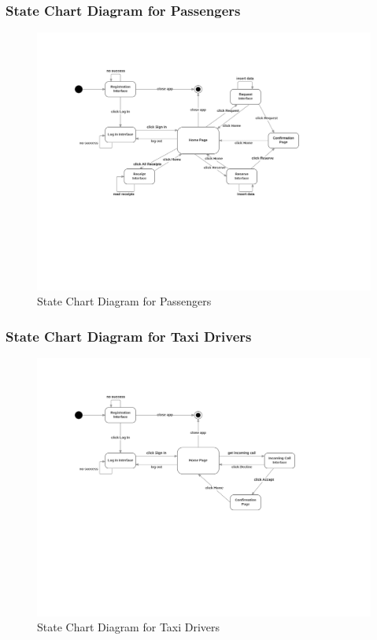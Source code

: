 \subsubsection{State Chart Diagram for Passengers}

\begin{figure}[htbp]
\centering
\includegraphics[width=\textwidth]{cpt/img/StateChartPass}
\caption{State Chart Diagram for Passengers}
\end{figure}

\subsubsection{State Chart Diagram for Taxi Drivers}

\begin{figure}[htbp]
\centering
\includegraphics[width=\textwidth]{cpt/img/StateChartDriver}
\caption{State Chart Diagram for Taxi Drivers}
\end{figure}
